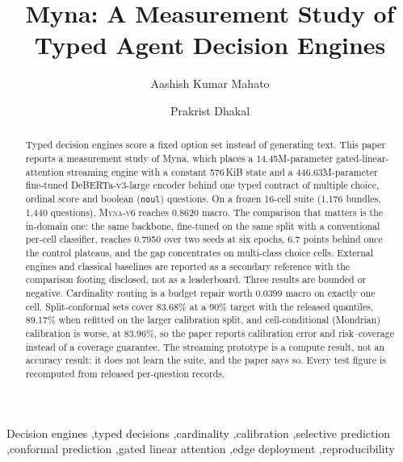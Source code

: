 \documentclass[final,3p,times,twocolumn]{elsarticle}
\newcommand{\vsix}{\textsc{Myna-v6}}
\begin{document}
\begin{frontmatter}
\title{Myna: A Measurement Study of Typed Agent Decision Engines}
\author[1]{Aashish Kumar Mahato}
\author[2]{Prakrist Dhakal}
\begin{abstract}
Typed decision engines score a fixed option set instead of generating text. This paper reports a
measurement study of Myna, which places a 14.45M-parameter gated-linear-attention streaming engine
with a constant 576\,KiB state and a 446.63M-parameter fine-tuned DeBERTa-v3-large encoder behind one
typed contract of multiple choice, ordinal score and boolean (\texttt{noul}) questions. On a frozen
16-cell suite (1,176 bundles, 1,440 questions), \vsix{} reaches 0.8620 macro. The comparison that
matters is the in-domain one: the same backbone, fine-tuned on the same split with a conventional
per-cell classifier, reaches 0.7950 over two seeds at six epochs, 6.7 points behind once the control plateaus, and the gap concentrates on
multi-class choice cells. External engines and classical baselines are reported as a
secondary reference with the comparison footing disclosed, not as a leaderboard. Three results are bounded or negative.
Cardinality routing is a budget repair worth 0.0399 macro on exactly one cell. Split-conformal sets
cover 83.68\% at a 90\% target with the released quantiles, 89.17\% when refitted on the larger
calibration split, and cell-conditional (Mondrian) calibration is worse, at 83.96\%, so the paper
reports calibration error and risk--coverage instead of a coverage guarantee. The streaming
prototype is a compute result, not an accuracy result: it does not learn the suite, and the paper
says so. Every test figure is recomputed from released per-question records.
\end{abstract}
\begin{keyword}
Decision engines \sep typed decisions \sep cardinality \sep calibration \sep selective prediction \sep conformal prediction \sep gated linear attention \sep edge deployment \sep reproducibility
\end{keyword}
\end{frontmatter}



\clearpage

\end{document}
